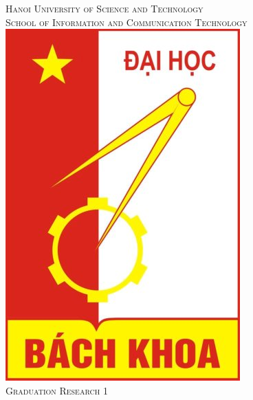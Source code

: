 \begin{titlepage}

\newcommand{\HRule}{\rule{\linewidth}{0.5mm}} %

\center %
 

\textsc{\Large Hanoi University of Science and Technology }\\[0.3cm] %
\textsc{\large School of Information and Communication Technology}\\[3cm] %
\includegraphics[scale=0.4]{LogoBKchuan.jpg}\\[1cm] %
\textsc{\LARGE Graduation Research 1}\\



\end{titlepage}
